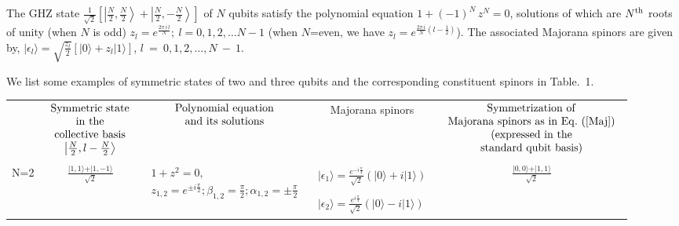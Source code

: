 \documentclass[pra,preprint,a4paper,superscriptaddress]{revtex4}
\begin{document}
{The   GHZ state $\frac{1}{\sqrt{2}}\left[\left\vert \frac{N}{2},\frac{N}{2}\right\rangle+ 
\left\vert \frac{N}{2},-\frac{N}{2}\right\rangle\right]$ of $N$ qubits  satisfy the polynomial equation 
$1 +(-1)^N\, z^{N}=0$, solutions of which are  $N^{\rm th}$ roots of unity (when $N$ is odd)
$z_{l}=e^{\frac{2\pi\, i\, l}{N}};\ l=0,1,2,\ldots N-1$ (when $N$=even, we have
$z_{l}=e^{\frac{2\pi\, i}{N}(l-\frac{1}{2})}$). The associated  Majorana spinors are given by,  
$\vert \epsilon_{l}\rangle=\sqrt{\frac{z_l}{2}}\left[ \vert 0\rangle + z_l \vert 1\rangle\right]$, $l~=~0,1,2,\ldots, N~-~1.$ 

We list some examples of   symmetric states of two and three qubits and the corresponding constituent spinors in Table.~1. 
\begin{table}
{\scriptsize\begin{tabular}{|c c|c|c|c|}
\hline
 & $\begin{array}{cc} {\rm Symmetric\ state} \\ {\rm in\ the} \\ {\rm collective\ basis}\\ \left\vert
\frac{N}{2},l-\frac{N}{2}\right\rangle \end{array}$ & $\begin{array}{c}{\rm Polynomial\ equation}\\ {\rm and \ its \  %
solutions}\end{array}$ & Majorana spinors 
 & $\begin{array}{c} {\rm Symmetrization\ of}\\ {\rm Majorana\ spinors\ as\ in\ Eq.~(\ref{Maj})} \\ 
 ({\rm expressed\ in\ the}\\ {\rm standard\ qubit\ basis})\end{array}$
 \\
& &  & & \\
\hline 
 N=2 & $\frac{\vert 1,1\rangle + \vert 1,-1\rangle}{\sqrt{2}}$
& $\begin{array}{c} 1+ z^2=0, \\ 
z_{1,2}=e^{\pm i\frac{\pi}{2}}; \beta_{1,2}=\frac{\pi}{2}; \alpha_{1,2}=\pm\frac{\pi}{2}\end{array}$
& $\begin{array}{c} \vert \epsilon_{1}\rangle=
  \frac{e^{-i\frac{\pi}{4}}}{\sqrt{2}}\left(\vert0\rangle+  i \vert 1\rangle\right) \\
  \\ \vert \epsilon_{2}\rangle=
  \frac{e^{i\frac{\pi}{4}}}{\sqrt{2}}\left(\vert0\rangle-  i \vert 1\rangle\right)\end{array}$ & $\frac{\vert 0,0\rangle + \vert 1,1\rangle}{\sqrt{2}}$ \\

\end{tabular}}
\end{table}}
\end{document}
